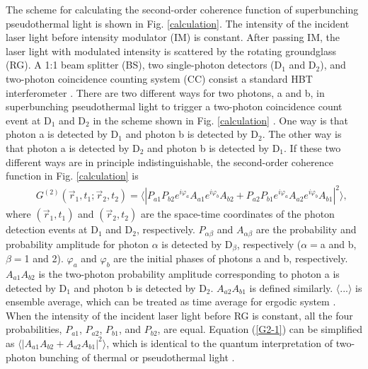 \documentclass[12pt]{iopart}
\begin{document}
The scheme for calculating the second-order coherence function of superbunching pseudothermal light is shown in Fig. \ref{calculation}. The intensity of the incident laser light before intensity modulator (IM) is constant. After passing IM, the laser light with modulated intensity is scattered by the rotating groundglass (RG). A 1:1 beam splitter (BS), two single-photon detectors (D$_1$ and D$_2$), and two-photon coincidence counting system (CC) consist a standard HBT interferometer \cite{HBT}. There are two different ways for two photons, a and b, in superbunching pseudothermal light to trigger a two-photon coincidence count event at D$_1$ and D$_2$ in the scheme shown in Fig. \ref{calculation} \cite{zhou,fano,shih-book}. One way is that photon a is detected by D$_1$ and photon b is detected by D$_2$. The other way is that photon a is detected by D$_2$ and photon b is detected by D$_1$. If these two different ways are in principle indistinguishable, the second-order coherence function in Fig. \ref{calculation} is \cite{liu-6,feynman}
\begin{eqnarray}\label{G2-1}
&&G^{(2)}(\vec{r}_1,t_1;\vec{r}_2,t_2)=
\langle |P_{a1}P_{b2}e^{i\varphi_a}A_{a1}e^{i\varphi_b}A_{b2}+P_{a2}P_{b1}e^{i\varphi_a}A_{a2}e^{i\varphi_b}A_{b1} |^2 \rangle,
\end{eqnarray}
where $(\vec{r}_1,t_1)$ and $(\vec{r}_2,t_2)$ are the space-time coordinates of the photon detection events at D$_1$ and D$_2$, respectively. $P_{\alpha \beta}$ and $A_{\alpha \beta}$ are the probability and probability amplitude for photon $\alpha$ is detected by D$_\beta$, respectively ($\alpha=$a and b, $\beta=$1 and 2). $\varphi_a$ and $\varphi_b$ are the initial phases of photons a and b, respectively. $A_{a1}A_{b2}$ is the two-photon probability amplitude corresponding to photon a is detected by D$_1$ and photon b is detected by D$_2$. $A_{a2}A_{b1}$ is defined similarly. $\langle ... \rangle$ is ensemble average, which can be treated as time average for ergodic system \cite{mandel-book}. When the intensity of the incident laser light before RG is constant, all the four probabilities, $P_{a1}$, $P_{a2}$, $P_{b1}$, and $P_{b2}$, are equal. Equation (\ref{G2-1}) can be simplified as $\langle |A_{a1}A_{b2}+A_{a2}A_{b1} |^2 \rangle$, which is identical to the quantum interpretation of two-photon bunching of thermal or pseudothermal light \cite{fano,shih-book}. 
\end{document}
